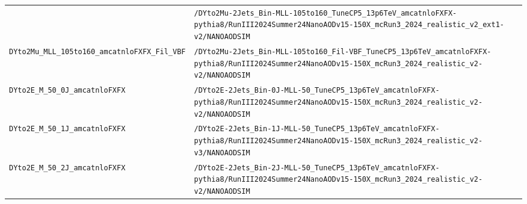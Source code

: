\begin{longtable}{@{}>{\RaggedRight\arraybackslash}p{} >{\RaggedRight\arraybackslash}p{}@{}}
 & \texttt{/\allowbreak{}DYto2Mu-\allowbreak{}2Jets\_\allowbreak{}Bin-\allowbreak{}MLL-\allowbreak{}105to160\_\allowbreak{}TuneCP5\_\allowbreak{}13p6TeV\_\allowbreak{}amcatnloFXFX-\allowbreak{}pythia8/\allowbreak{}RunIII2024Summer24NanoAODv15-\allowbreak{}150X\_\allowbreak{}mcRun3\_\allowbreak{}2024\_\allowbreak{}realistic\_\allowbreak{}v2\_\allowbreak{}ext1-\allowbreak{}v2/\allowbreak{}NANOAODSIM} \\
\addlinespace[2pt]
\texttt{DYto2Mu\_\allowbreak{}MLL\_\allowbreak{}105to160\_\allowbreak{}amcatnloFXFX\_\allowbreak{}Fil\_\allowbreak{}VBF} & \texttt{/\allowbreak{}DYto2Mu-\allowbreak{}2Jets\_\allowbreak{}Bin-\allowbreak{}MLL-\allowbreak{}105to160\_\allowbreak{}Fil-\allowbreak{}VBF\_\allowbreak{}TuneCP5\_\allowbreak{}13p6TeV\_\allowbreak{}amcatnloFXFX-\allowbreak{}pythia8/\allowbreak{}RunIII2024Summer24NanoAODv15-\allowbreak{}150X\_\allowbreak{}mcRun3\_\allowbreak{}2024\_\allowbreak{}realistic\_\allowbreak{}v2-\allowbreak{}v2/\allowbreak{}NANOAODSIM} \\
\addlinespace[2pt]
\texttt{DYto2E\_\allowbreak{}M\_\allowbreak{}50\_\allowbreak{}0J\_\allowbreak{}amcatnloFXFX} & \texttt{/\allowbreak{}DYto2E-\allowbreak{}2Jets\_\allowbreak{}Bin-\allowbreak{}0J-\allowbreak{}MLL-\allowbreak{}50\_\allowbreak{}TuneCP5\_\allowbreak{}13p6TeV\_\allowbreak{}amcatnloFXFX-\allowbreak{}pythia8/\allowbreak{}RunIII2024Summer24NanoAODv15-\allowbreak{}150X\_\allowbreak{}mcRun3\_\allowbreak{}2024\_\allowbreak{}realistic\_\allowbreak{}v2-\allowbreak{}v2/\allowbreak{}NANOAODSIM} \\
\addlinespace[2pt]
\texttt{DYto2E\_\allowbreak{}M\_\allowbreak{}50\_\allowbreak{}1J\_\allowbreak{}amcatnloFXFX} & \texttt{/\allowbreak{}DYto2E-\allowbreak{}2Jets\_\allowbreak{}Bin-\allowbreak{}1J-\allowbreak{}MLL-\allowbreak{}50\_\allowbreak{}TuneCP5\_\allowbreak{}13p6TeV\_\allowbreak{}amcatnloFXFX-\allowbreak{}pythia8/\allowbreak{}RunIII2024Summer24NanoAODv15-\allowbreak{}150X\_\allowbreak{}mcRun3\_\allowbreak{}2024\_\allowbreak{}realistic\_\allowbreak{}v2-\allowbreak{}v3/\allowbreak{}NANOAODSIM} \\
\addlinespace[2pt]
\texttt{DYto2E\_\allowbreak{}M\_\allowbreak{}50\_\allowbreak{}2J\_\allowbreak{}amcatnloFXFX} & \texttt{/\allowbreak{}DYto2E-\allowbreak{}2Jets\_\allowbreak{}Bin-\allowbreak{}2J-\allowbreak{}MLL-\allowbreak{}50\_\allowbreak{}TuneCP5\_\allowbreak{}13p6TeV\_\allowbreak{}amcatnloFXFX-\allowbreak{}pythia8/\allowbreak{}RunIII2024Summer24NanoAODv15-\allowbreak{}150X\_\allowbreak{}mcRun3\_\allowbreak{}2024\_\allowbreak{}realistic\_\allowbreak{}v2-\allowbreak{}v2/\allowbreak{}NANOAODSIM} \\

\end{longtable}
